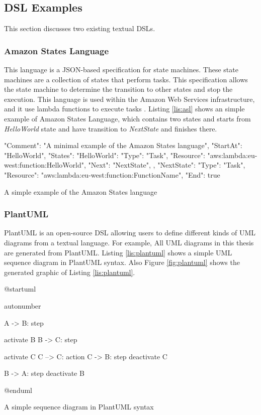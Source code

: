 \subsection{DSL Examples}
This section discusses two existing textual DSLs.

\subsubsection{Amazon States Language}
This language is a JSON-based specification for state machines. These state machines are a collection of states that perform tasks. This specification allows the state machine to determine the transition to other states and stop the execution. This language is used within the Amazon Web Services infrastructure, and it use lambda functions to execute tasks \cite{amazonwebservices}. Listing \ref{lis:asl} shows an simple example of Amazon States Language, which contains two states and starts from \textit{HelloWorld} state and have transition to \textit{NextState} and finishes there.

\FloatBarrier
\begin{code}
\begin{json}
{
    "Comment": "A minimal example of the Amazon States language",
    "StartAt": "HelloWorld",
    "States": {
        "HelloWorld": {
          "Type": "Task",
          "Resource": "aws:lambda:eu-west:function:HelloWorld",
          "Next": "NextState",
        },
        "NextState": {
          "Type": "Task",
          "Resource": "aws:lambda:eu-west:function:FunctionName",
          "End": true
        }        
    }
}
\end{json}
\caption{A simple example of the Amazon States language \cite{amazonstate}}
\label{lis:asl}
\end{code}
\FloatBarrier

\subsubsection{PlantUML}
PlantUML is an open-source DSL allowing users to define different kinds of UML diagrams from a textual language. For example, All UML diagrams in this thesis are generated from PlantUML.
Listing \ref{lis:plantuml} shows a simple UML sequence diagram in PlantUML syntax. Also Figure \ref{fig:plantuml} shows the generated graphic of Listing \ref{lis:plantuml}.

\FloatBarrier
\begin{code}
\begin{js2}
@startuml

autonumber

A -> B: step

activate B
B -> C: step

activate C
C --> C: action
C -> B: step
deactivate C

B -> A: step
deactivate B

@enduml
\end{js2}
\caption{A simple sequence diagram in PlantUML syntax}
\label{lis:plantuml}
\end{code}
\FloatBarrier

